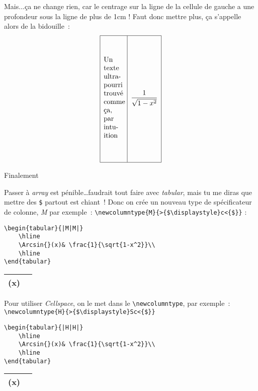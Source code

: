 \documentclass{article}
\DeclareMathOperator{\Arcsin}{Arcsin}
\begin{document}
Mais...ça ne change rien, car le centrage sur la ligne de la cellule de
gauche a une profondeur sous la ligne de plus de 1cm ! Faut donc mettre
plus, ça s'appelle alors de la bidouille~:
$$
\setlength{\extrarowheight}{1cm}
\begin{array}{|m{1cm}|c|}
	\hline
	\textrm{Un texte ultra-pourri trouvé comme ça, par intuition}
	& \dfrac{1}{\sqrt{1-x^2}}\\[3cm]
	\hline
\end{array}
$$

\pagebreak
\begin{center}
	\Large Finalement
\end{center}

Passer à \textsl{array} est pénible\dots faudrait tout faire avec
\textsl{tabular}, mais tu me diras que mettre des \verb|$| partout est
chiant~! Donc on crée un nouveau type de spécificateur de colonne,
\textsl{M} par exemple~:
\verb|\newcolumntype{M}{>{$\displaystyle}c<{$}}| :

\begin{verbatim}
\begin{tabular}{|M|M|}
    \hline
    \Arcsin{}(x)& \frac{1}{\sqrt{1-x^2}}\\
    \hline
\end{tabular}
\end{verbatim}
\begin{tabular}{|M|M|}
	\hline
	\Arcsin{}(x)& \\
	\hline
\end{tabular}

Pour utiliser \textsl{Cellspace}, on le met dans le
\verb|\newcolumntype|, par exemple~:
\verb|\newcolumntype{H}{>{$\displaystyle}Sc<{$}}|

\begin{verbatim}
\begin{tabular}{|H|H|}
    \hline
    \Arcsin{}(x)& \frac{1}{\sqrt{1-x^2}}\\
    \hline
\end{tabular}
\end{verbatim}
\begin{tabular}{|H|H|}
	\hline
	\Arcsin{}(x)& \\
	\hline
\end{tabular}
\end{document}
